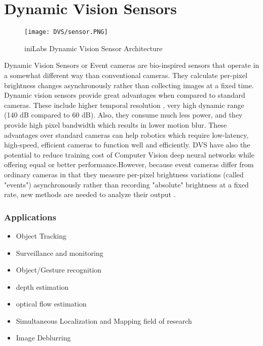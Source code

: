 \documentclass[12pt]{report}
\begin{document}
\chapter{Dynamic Vision Sensors}

\begin{wrapfigure}{r}{0.25\textwidth} %
    \centering
     \texttt{[image: DVS/sensor.PNG]}
    \caption{iniLabs Dynamic Vision Sensor Architecture}
    \label{fig:dvs-sensor}
\end{wrapfigure}

Dynamic Vision Sensors or Event cameras are bio-inspired sensors that operate in a somewhat different way than conventional cameras. They calculate per-pixel brightness changes asynchronously rather than collecting images at a fixed time. Dynamic vision sensors provide great advantages when compared to standard cameras. These include higher temporal resolution , very high dynamic range (140 dB compared to 60 dB). Also, they consume much less power, and they provide high pixel bandwidth which results in lower motion blur.  These advantages over standard cameras can help robotics which require low-latency, high-speed, efficient cameras to function well and efficiently. DVS have also the potential to reduce training cost of Computer Vision deep neural networks while offering equal or better performance.However, because event cameras differ from ordinary cameras in that they measure per-pixel brightness variations (called "events") asynchronously rather than recording "absolute" brightness at a fixed rate, new methods are needed to analyze their output .

\subsection{Applications}

\begin{itemize}
    \item Object Tracking
    \item Surveillance and monitoring
    \item Object/Gesture recognition
    \item depth estimation
    \item optical flow estimation 
    \item Simultaneous Localization and Mapping field of research
    \item Image Deblurring
\end{itemize}
\end{document}

